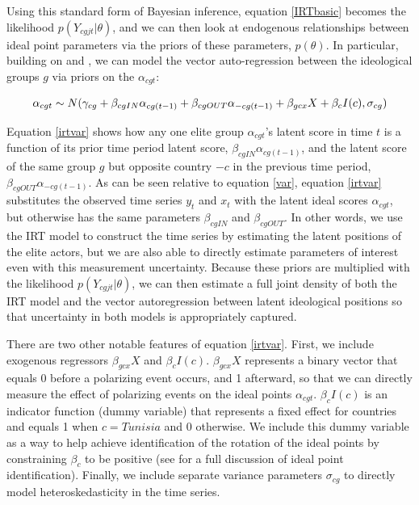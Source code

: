 \documentclass[12pt]{article}
\begin{document}
Using this standard form of Bayesian inference, equation \ref{IRTbasic} becomes the likelihood $p(Y_{cgjt}|\theta)$, and we can then look at endogenous relationships between ideal point parameters via the priors of these parameters, $p(\theta)$. In particular, building on \textcite{quinn2002} and \textcite{kropko2013}, we can model the vector auto-regression between the ideological groups $g$ via priors on the $\alpha_{cgt}$:

\begin{equation}\label{irtvar}
\alpha_{cgt}  \sim N(\gamma_{cg} + \beta_{cgIN}\alpha_{cg(t-1)} + \beta_{cgOUT}\alpha_{-cg(t-1)} + \beta_{gcx} X + \beta_c I(c),\sigma_{cg})\\
\end{equation}

Equation \ref{irtvar} shows how any one elite group $\alpha_{cgt}$'s latent score in time $t$ is a function of its prior time period latent score, $\beta_{cgIN}\alpha_{cg(t-1)}$, and the latent score of the same group $g$ but opposite country $-c$ in the previous time period, $\beta_{cgOUT}\alpha_{-cg(t-1)}$. As can be seen relative to equation \ref{var}, equation \ref{irtvar} substitutes the observed time series $y_t$ and $x_t$ with the latent ideal scores $\alpha_{cgt}$, but otherwise has the same parameters $\beta_{cgIN}$ and $\beta_{cgOUT}$. In other words, we use the IRT model to construct the time series by estimating the latent positions of the elite actors, but we are also able to directly estimate parameters of interest even with this measurement uncertainty. Because these priors are multiplied with the likelihood $p(Y_{cgjt}|\theta)$, we can then estimate a full joint density of both the IRT model and the vector autoregression between latent ideological positions so that uncertainty in both models is appropriately captured.

There are two other notable features of equation \ref{irtvar}. First, we include exogenous regressors $\beta_{gcx} X$ and $\beta_c I(c)$. $\beta_{gcx} X$ represents a binary vector that equals 0 before a polarizing event occurs, and 1 afterward, so that we can directly measure the effect of polarizing events on the ideal points $\alpha_{cgt}$. $\beta_c I(c)$ is an indicator function (dummy variable) that represents a fixed effect for countries and equals 1 when $c=Tunisia$ and 0 otherwise. We include this dummy variable as a way to help achieve identification of the rotation of the ideal points by constraining $\beta_c$ to be positive (see \parencite{gelman2005} for a full discussion of ideal point identification). Finally, we include separate variance parameters $\sigma_{cg}$ to directly model heteroskedasticity in the time series.
\end{document}
